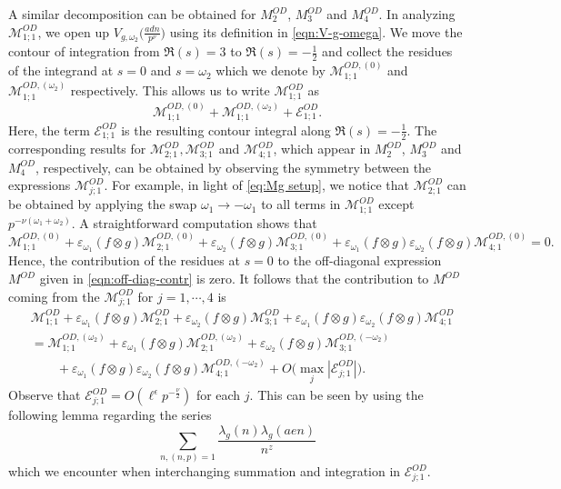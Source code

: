 \documentclass[12pt]{amsart}
\theoremstyle{plain}
\theoremstyle{definition}
\newcommand{\ve}{\varepsilon}
\begin{document}
 
A similar decomposition can be obtained for $M_{2}^{OD}$,  $M_{3}^{OD}$ and  $M_{4}^{OD}$. 
In analyzing $\mathscr{M}_{1;1}^{OD}$, we open up $V_{g, \omega_2} \big(\frac{adn}{p^\nu }\big)$ using its definition in \eqref{eqn:V-g-omega}. We move the contour of integration from $\Re(s)=3$ to $\Re(s)=-\frac12$ and collect the residues of the integrand at $s=0$ and $s= \omega_2$ which we denote by $\mathscr{M}_{1;1}^{OD,(0)}$ and $\mathscr{M}_{1;1}^{OD,(\omega_2)}$ respectively.  This  allows us to write $\mathscr{M}_{1;1}^{OD}$ as 
\[\mathscr{M}_{1;1}^{OD,(0)}+\mathscr{M}_{1;1}^{OD,(\omega_2)}+\mathscr{E}_{1;1}^{OD}.\] Here, the term $\mathscr{E}_{1;1}^{OD}$ is the resulting contour integral along $\Re(s)=-\frac12$. The corresponding results for  $\mathscr{M}_{2;1}^{OD}, \mathscr{M}_{3;1}^{OD}$ and $\mathscr{M}_{4;1}^{OD}$, which appear in $M_{2}^{OD}$,  $M_{3}^{OD}$ and  $M_{4}^{OD}$, respectively, can be obtained by observing the symmetry between the expressions $\mathscr{M}_{j;1}^{OD}$. For example, in light of \eqref{eq:Mg setup}, we notice that $\mathscr{M}^{OD}_{2;1}$ can be obtained by applying the swap $\omega_1 \to -\omega_1$ to all terms in $\mathscr{M}_{1;1}^{OD}$ except $p^{-\nu(\omega_1+\omega_2)}$. A straightforward computation shows that 
\[
 \mathscr{M}_{1;1}^{OD,(0)}
     +\ve_{\omega_1}(f\otimes g)\mathscr{M}_{2;1}^{OD,(0)}
  +\ve_{\omega_2}(f\otimes g)\mathscr{M}_{3;1}^{OD,(0)}
      +\ve_{\omega_1}(f\otimes g)\ve_{\omega_2}(f\otimes g) \mathscr{M}_{4;1}^{OD,(0)}=0.
\]
Hence, the contribution of the residues at $s=0$ to the off-diagonal expression $M^{OD}$ given in \eqref{eqn:off-diag-contr} is zero. It follows that the contribution to $M^{OD}$ coming from the $\mathscr{M}_{j;1}^{OD}$ for $j=1,\cdots,4$ is
\begin{equation}\label{eqn:fancyMOD11}
\begin{split}
&\mathscr{M}_{1;1}^{OD}
     +\ve_{\omega_1}(f\otimes g)\mathscr{M}_{2;1}^{OD}
  +\ve_{\omega_2}(f\otimes g)\mathscr{M}_{3;1}^{OD}
      +\ve_{\omega_1}(f\otimes g)\ve_{\omega_2}(f\otimes g) \mathscr{M}_{4;1}^{OD} \\
      &= \mathscr{M}_{1;1}^{OD,(\omega_2)}
     +\ve_{\omega_1}(f\otimes g)\mathscr{M}_{2;1}^{OD,(\omega_2)}
  +\ve_{\omega_2}(f\otimes g)\mathscr{M}_{3;1}^{OD,(-\omega_2)}
  \\
     &\qquad +\ve_{\omega_1}(f\otimes g)\ve_{\omega_2}(f\otimes g) \mathscr{M}_{4;1}^{OD,(-\omega_2)} 
    +O\Big(\max_{j}\left|\mathscr{E}_{j;1}^{OD}\right|\Big).
\end{split}
\end{equation}
Observe that $\mathscr{E}_{j;1}^{OD}=O(\ell^{\epsilon}p^{-\frac{\nu}{2}})$ for each $j$. This can be seen by using the following lemma regarding the series \[\sum_{n, (n, p)=1}  \frac{\lambda_g(n)  \lambda_g(aen)}{n^{z}}\] which we encounter when interchanging summation and integration in $\mathscr{E}_{j;1}^{OD}$.
\end{document}
